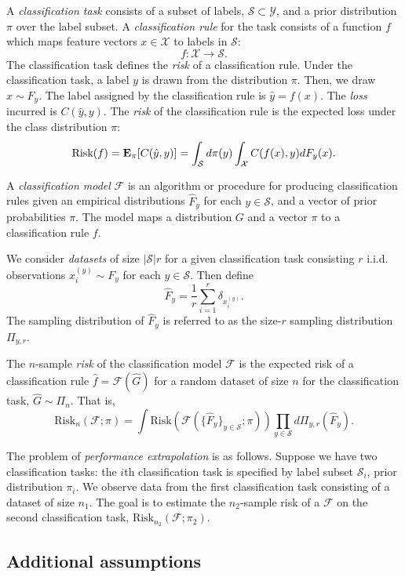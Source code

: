 \documentclass[12pt]{article}
\begin{document}
A \emph{classification task} consists of a subset of labels,
$\mathcal{S} \subset \mathcal{Y}$, and a prior distribution $\pi$ over
the label subset.  A \emph{classification rule} for the task consists
of a function $f$ which maps feature vectors $x \in \mathcal{X}$ to
labels in $\mathcal{S}$:
\[
f: \mathcal{X} \to \mathcal{S}.
\]
The classification task defines the \emph{risk} of a classification
rule.  Under the classification task, a label $y$ is drawn from the
distribution $\pi$.  Then, we draw $x \sim F_y$.  The label assigned
by the classification rule is $\hat{y} = f(x)$.  The \emph{loss}
incurred is $C(\hat{y}, y)$.  The \emph{risk} of the classification
rule is the expected loss under the class distribution $\pi$:
\[
\text{Risk}(f) = \textbf{E}_\pi[C(\hat{y}, y)] = \int_\mathcal{S} d \pi(y) \int_{\mathcal{X}} C(f(x), y) dF_y(x).
\]

A \emph{classification model} $\mathcal{F}$ is an algorithm or
procedure for producing classification rules given an empirical
distributions $\hat{F}_y$ for each $y \in \mathcal{S}$, and a vector
of prior probabilities $\pi$.  The model maps a distribution $G$ and a
vector $\pi$ to a classification rule $f$.

We consider \emph{datasets} of size $|\mathcal{S}|r$ for a given
classification task consisting $r$ i.i.d. observations $x_i^{(y)} \sim
F_y$ for each $y \in \mathcal{S}$.  Then define 
\[\hat{F}_y = \frac{1}{r}\sum_{i=1}^r \delta_{x_i^{(y)}}.\]
The sampling distribution of $\hat{F}_y$ is referred to as the
size-$r$ sampling distribution $\Pi_{y, r}$.

The $n$-sample \emph{risk} of the classification model $\mathcal{F}$
is the expected risk of a classification rule $\hat{f} =
\mathcal{F}(\hat{G})$ for a random dataset of size $n$ for the
classification task, $\hat{G} \sim \Pi_n$.  That is,
\[
\text{Risk}_n(\mathcal{F}; \pi) =
\int \text{Risk}(\mathcal{F}(\{\hat{F}_y\}_{y \in \mathcal{S}};
\pi)) \prod_{y \in \mathcal{S}} d\Pi_{y, r}(\hat{F}_y).
\]

The problem of \emph{performance extrapolation} is as follows.
Suppose we have two classification tasks: the $i$th classification
task is specified by label subset $\mathcal{S}_i$, prior distribution
$\pi_i$.  We observe data from the first classification task
consisting of a dataset of size $n_1$.  The goal is to estimate the
$n_2$-sample risk of a $\mathcal{F}$ on the second classification
task, $\text{Risk}_{n_2}(\mathcal{F}; \pi_2)$.

\subsection{Additional assumptions}
\end{document}
